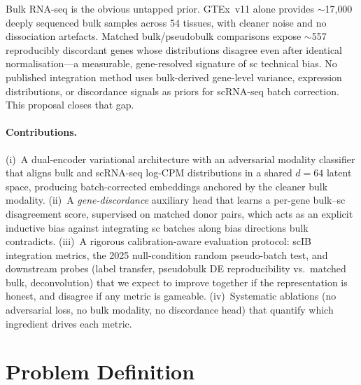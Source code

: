 \documentclass[11pt]{article}
\begin{document}
Bulk RNA-seq is the obvious untapped prior. GTEx~v11 alone provides
$\sim$17{,}000 deeply sequenced bulk samples across 54 tissues, with cleaner
noise and no dissociation artefacts. Matched bulk/pseudobulk comparisons
expose $\sim$557 reproducibly discordant genes \citep{hu-2026-bal} whose
distributions disagree even after identical normalisation---a measurable,
gene-resolved signature of sc technical bias. No published integration
method uses bulk-derived gene-level variance, expression distributions, or
discordance signals as priors for scRNA-seq batch correction. This proposal
closes that gap.

\paragraph{Contributions.}
(i)~A dual-encoder variational architecture with an adversarial modality
classifier that aligns bulk and scRNA-seq log-CPM distributions in a shared
$d{=}64$ latent space, producing batch-corrected embeddings anchored by the
cleaner bulk modality.
(ii)~A \emph{gene-discordance} auxiliary head that learns a per-gene bulk--sc
disagreement score, supervised on matched donor pairs, which acts as an
explicit inductive bias against integrating sc batches along bias directions
bulk contradicts.
(iii)~A rigorous calibration-aware evaluation protocol: scIB integration
metrics, the 2025 null-condition random pseudo-batch test, and downstream
probes (label transfer, pseudobulk DE reproducibility vs.\ matched bulk,
deconvolution) that we expect to improve together if the representation is
honest, and disagree if any metric is gameable.
(iv)~Systematic ablations (no adversarial loss, no bulk modality, no
discordance head) that quantify which ingredient drives each metric.

\section{Problem Definition}
\end{document}
